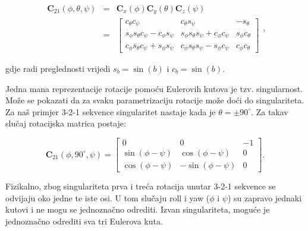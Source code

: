 \documentclass[times, utf8, diplomski, numeric]{templates/template}
\begin{document}
{{{            \begin{equation}
            \label{eq:euler_rot_mat}
            \begin{array}{rcl}
            \textbf{C}_{21}(\phi, \theta, \psi) & = & \textbf{C}_{x}(\phi) \textbf{C}_{y}(\theta) \textbf{C}_{z}(\psi) \\
            & = &
            \begin{bmatrix}
                c_{\theta}c_{\psi}                            & c_{\theta}s_{\psi}                            & -s_{\theta} \\
                s_{\phi}s_{\theta}c_{\psi} - c_{\phi}s_{\psi} & s_{\phi}s_{\theta}s_{\psi} + c_{\phi}c_{\psi} & s_{\phi}c_{\theta} \\
                c_{\phi}s_{\theta}c_{\psi} + s_{\phi}s_{\psi} & c_{\phi}s_{\theta}s_{\psi} - s_{\phi}c_{\psi} & c_{\phi}c_{\theta}
            \end{bmatrix}
            \end{array}
            ,
            \end{equation}

            gdje radi preglednosti vrijedi $s_{b}=\sin(b)$ i $c_{b}=\sin(b)$.

            Jedna mana reprezentacije rotacije pomoću Eulerovih kutova je tzv. singularnost. Može se pokazati da za svaku parametrizaciju rotacije može doći do singulariteta. Za naš primjer 3-2-1 sekvence singularitet nastaje kada je $\theta=\pm90^{\circ}$. Za takav slučaj rotacijska matrica postaje:

            \begin{equation}
            \textbf{C}_{21}(\phi, 90^{\circ}, \psi) =
            \begin{bmatrix}
                0                 & 0                  & -1 \\
                \sin(\phi - \psi) & \cos(\phi - \psi)  &  0 \\
                \cos(\phi - \psi) & -\sin(\phi - \psi) &  0
            \end{bmatrix}
            .
            \end{equation}

            Fizikalno, zbog singulariteta prva i treća rotacija unutar 3-2-1 sekvence se odvijaju oko jedne te iste osi. U tom slučaju roll i yaw ($\phi$ i $\psi$) su zapravo jednaki kutovi i ne mogu se jednoznačno odrediti. Izvan singulariteta, moguće je jednoznačno odrediti sva tri Eulerova kuta. 
            
}}}
\end{document}
